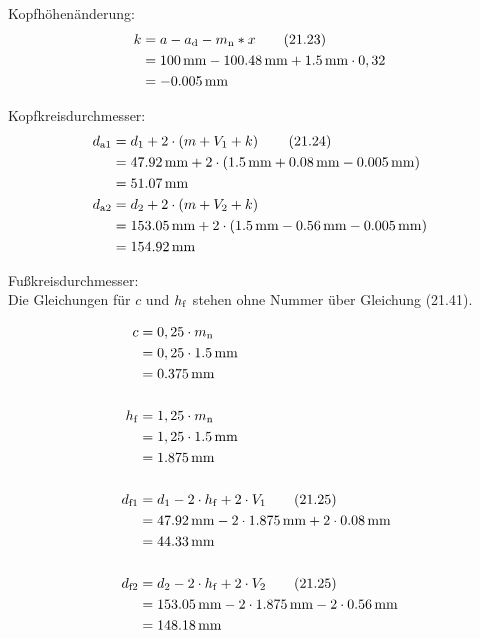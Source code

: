 \documentclass[15pt,a4paper]{article}
\begin{document}
	 
	 Kopfhöhenänderung:	 
	 \begin{align}
	 	k &= a- a_{\rm d} - m_{\rm n} * x \tag{21.23}\\
	  	&= \SI{100}{\milli\m} - \SI{100,48}{\milli\metre} + \SI{1,5}{\milli\metre} \cdot 0,32 \notag\\
	 	&= \SI{-0,005}{\milli\m} \notag
	 \end{align}
	 	 
	 Kopfkreisdurchmesser:
	 \begin{align}
	 	d_{\rm a1} &= d_1 + 2 \cdot\left( m+V_1 +k\right)  \tag{21.24} \\
	 	&= \SI{47,92}{\milli\metre} + 2 \cdot\left( \SI{1,5}{\milli\metre}+ \SI{0,08}{\milli\m} -\SI{0.005}{\milli\m}\right) \notag \\
	 	&=\SI{51,07}{\milli\m} \notag \\
	 	d_{\rm a2} &= d_2 + 2 \cdot\left( m+V_2 +k\right) \notag \\
	 	&= \SI{153,05}{\milli\metre} + 2 \cdot\left( \SI{1,5}{\milli\metre}- \SI{0,56}{\milli\m} -\SI{0.005}{\milli\m}\right) \notag \\
	 	&=\SI{154,92}{\milli\m} \notag
	 \end{align}
	
	  
     Fußkreisdurchmesser:\\
     Die Gleichungen für $c$ und $h_{\rm f}$ stehen ohne Nummer über Gleichung (21.41).
     
     \begin{align}
     	c &= 0,25\cdot  m_{\rm n} \notag\\
     	&= 0,25 \cdot \SI{1,5}{\milli\metre}\notag\\
     	&= \SI{0,375}{\milli\metre} \notag \notag\\ \notag\\
     	h_{\rm f} &= 1,25\cdot m_{\rm n}\notag\\
     	&= 1,25\cdot \SI{1,5}{\milli\metre} \notag\\
     	&= \SI{1,875}{\milli\m} \notag \\ \notag\\
     	d_{\rm f1} &= d_1 -2\cdot h_{\rm f} + 2\cdot V_1 \tag{21.25}\\
     	&=\SI{47,92}{\milli\metre}-2\cdot \SI{1,875}{\milli\m}+2\cdot \SI{0,08}{\milli\m}\notag\\
     	&=\SI{44,33}{\milli\m}\notag\\ \notag\\
     	d_{\rm f2} &= d_2 -2\cdot h_{\rm f} + 2\cdot V_2 \tag{21.25}\\
     	&=\SI{153,05}{\milli\metre}-2\cdot \SI{1,875}{\milli\m}-2\cdot \SI{0,56}{\milli\m} \notag\\
     	&=\SI{148,18}{\milli\m}\notag
     \end{align}
     
\end{document}
